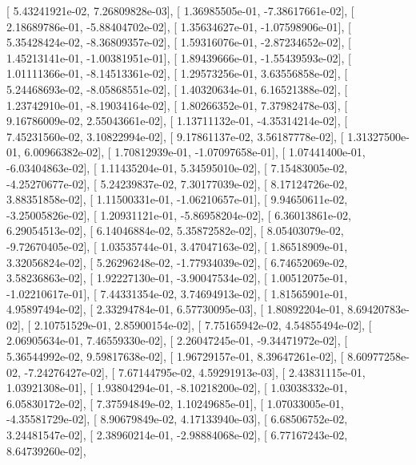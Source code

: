 \documentclass{article}
\begin{document}
       [  5.43241921e-02,   7.26809828e-03],
       [  1.36985505e-01,  -7.38617661e-02],
       [  2.18689786e-01,  -5.88404702e-02],
       [  1.35634627e-01,  -1.07598906e-01],
       [  5.35428424e-02,  -8.36809357e-02],
       [  1.59316076e-01,  -2.87234652e-02],
       [  1.45213141e-01,  -1.00381951e-01],
       [  1.89439666e-01,  -1.55439593e-02],
       [  1.01111366e-01,  -8.14513361e-02],
       [  1.29573256e-01,   3.63556858e-02],
       [  5.24468693e-02,  -8.05868551e-02],
       [  1.40320634e-01,   6.16521388e-02],
       [  1.23742910e-01,  -8.19034164e-02],
       [  1.80266352e-01,   7.37982478e-03],
       [  9.16786009e-02,   2.55043661e-02],
       [  1.13711132e-01,  -4.35314214e-02],
       [  7.45231560e-02,   3.10822994e-02],
       [  9.17861137e-02,   3.56187778e-02],
       [  1.31327500e-01,   6.00966382e-02],
       [  1.70812939e-01,  -1.07097658e-01],
       [  1.07441400e-01,  -6.03404863e-02],
       [  1.11435204e-01,   5.34595010e-02],
       [  7.15483005e-02,  -4.25270677e-02],
       [  5.24239837e-02,   7.30177039e-02],
       [  8.17124726e-02,   3.88351858e-02],
       [  1.11500331e-01,  -1.06210657e-01],
       [  9.94650611e-02,  -3.25005826e-02],
       [  1.20931121e-01,  -5.86958204e-02],
       [  6.36013861e-02,   6.29054513e-02],
       [  6.14046884e-02,   5.35872582e-02],
       [  8.05403079e-02,  -9.72670405e-02],
       [  1.03535744e-01,   3.47047163e-02],
       [  1.86518909e-01,   3.32056824e-02],
       [  5.26296248e-02,  -1.77934039e-02],
       [  6.74652069e-02,   3.58236863e-02],
       [  1.92227130e-01,  -3.90047534e-02],
       [  1.00512075e-01,  -1.02210617e-01],
       [  7.44331354e-02,   3.74694913e-02],
       [  1.81565901e-01,   4.95897494e-02],
       [  2.33294784e-01,   6.57730095e-03],
       [  1.80892204e-01,   8.69420783e-02],
       [  2.10751529e-01,   2.85900154e-02],
       [  7.75165942e-02,   4.54855494e-02],
       [  2.06905634e-01,   7.46559330e-02],
       [  2.26047245e-01,  -9.34471972e-02],
       [  5.36544992e-02,   9.59817638e-02],
       [  1.96729157e-01,   8.39647261e-02],
       [  8.60977258e-02,  -7.24276427e-02],
       [  7.67144795e-02,   4.59291913e-03],
       [  2.43831115e-01,   1.03921308e-01],
       [  1.93804294e-01,  -8.10218200e-02],
       [  1.03038332e-01,   6.05830172e-02],
       [  7.37594849e-02,   1.10249685e-01],
       [  1.07033005e-01,  -4.35581729e-02],
       [  8.90679849e-02,   4.17133940e-03],
       [  6.68506752e-02,   3.24481547e-02],
       [  2.38960214e-01,  -2.98884068e-02],
       [  6.77167243e-02,   8.64739260e-02],
\end{document}
